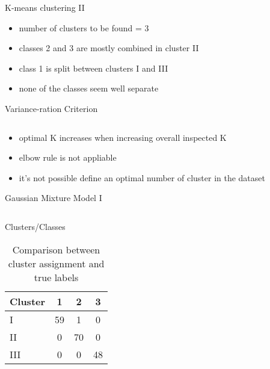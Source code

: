 \documentclass{beamer}
\begin{document}
\begin{frame}{K-means clustering II}
	\begin{itemize}
		\item{
		number of clusters to be found = 3
		}
		\item{
		classes 2 and 3 are mostly combined in cluster II
		}
		\item{
		class 1 is split between clusters I and III
		}
		\item{
		none of the classes seem well separate
		}
	\end{itemize}
\end{frame}

\begin{frame}{Variance-ration Criterion}
\begin{columns}[t]
\begin{column}{.3\textwidth}
\end{column}
\begin{column}{.3\textwidth}
\end{column}
\begin{column}{.3\textwidth}
\end{column}
\end{columns}

\vspace*{10pt}

\begin{itemize}
	\item{
	optimal K increases when increasing overall inspected K
	}
	\item{
	elbow rule is not appliable
	}
	\item{
	it's not possible define an optimal number of cluster in the dataset
	}
\end{itemize}
\end{frame}

\begin{frame}{Gaussian Mixture Model I}
\begin{columns}[t]
\begin{column}{.4\textwidth}
\begin{table}{Clusters/Classes}
\begin{tabular}{l || c | c | c  }
Cluster & 1 & 2 & 3 \\
\hline \hline
I & 59 & 1 & 0 \\ 
II & 0 & 70 & 0 \\
III & 0 & 0& 48 
\end{tabular}
\caption{{\scriptsize Comparison between cluster assignment and true labels}}
\end{table}
\end{column}
\begin{column}{.6\textwidth}
\end{column}
\end{columns}
\end{frame}
\end{document}
